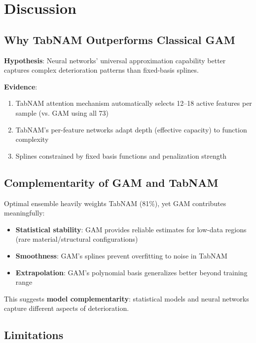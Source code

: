 \documentclass[twocolumn]{article}
\begin{document}
\section{Discussion}
\label{sec:discussion}

\subsection{Why TabNAM Outperforms Classical GAM}

\textbf{Hypothesis}: Neural networks' universal approximation capability better captures complex deterioration patterns than fixed-basis splines.

\textbf{Evidence}:
\begin{enumerate}
\item TabNAM attention mechanism automatically selects 12--18 active features per sample (vs. GAM using all 73)
\item TabNAM's per-feature networks adapt depth (effective capacity) to function complexity
\item Splines constrained by fixed basis functions and penalization strength
\end{enumerate}

\subsection{Complementarity of GAM and TabNAM}

Optimal ensemble heavily weights TabNAM (81\%), yet GAM contributes meaningfully:
\begin{itemize}
\item \textbf{Statistical stability}: GAM provides reliable estimates for low-data regions (rare material/structural configurations)
\item \textbf{Smoothness}: GAM's splines prevent overfitting to noise in TabNAM
\item \textbf{Extrapolation}: GAM's polynomial basis generalizes better beyond training range
\end{itemize}

This suggests \textbf{model complementarity}: statistical models and neural networks capture different aspects of deterioration.

\subsection{Limitations}
\end{document}

